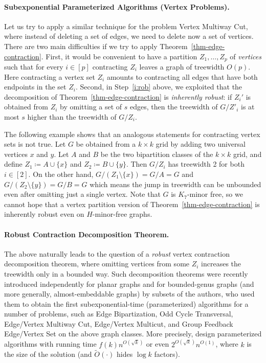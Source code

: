 \documentclass[a4paper,11pt]{article}
\numberwithin{lemma}{section}
\begin{document}
\paragraph{Subexponential Parameterized Algorithms (Vertex Problems).}
Let us try to apply a similar technique for the problem {\sc Vertex Multiway Cut}, where instead of deleting a set of edges, we need to delete now a set of vertices.
There are two main difficulties if we try to apply Theorem~\ref{thm-edge-contraction}.
First, it would be convenient to have a partition $Z_1,\dots,Z_p$ of \emph{vertices} such that for every $i \in [p]$ contracting $Z_i$ leaves a graph of treewidth $O(p)$.
Here contracting a vertex set $Z_i$ amounts to contracting all edges that have both endpoints in  the set $Z_i$.
Second, in Step~\ref{i:rob} above, we exploited that the decomposition of Theorem~\ref{thm-edge-contraction} is \emph{inherently robust}: if $Z_i'$ is obtained from $Z_i$ by omitting a set of $s$ edges, then the treewidth of $G/Z'_i$ is at most $s$ higher than the treewidth of $G/Z_i$.

The following example shows that an analogous statements for contracting vertex sets is not true.
Let $G$ be obtained from a $k\times k$ grid by adding two universal vertices $x$ and $y$.
Let $A$ and $B$ be the two bipartition classes of the $k\times k$ grid, and define $Z_1 \coloneqq A \cup \{x\}$ and $Z_2 \coloneqq B \cup \{y\}$.
Then $G/Z_i$ has treewidth 2 for both $i \in [2]$.
On the other hand, $G/(Z_1\setminus \{x\}) = G/A = G$ and $G/(Z_2\setminus \{y\}) = G/B = G$ which means the jump in treewidth can be unbounded even after omitting just a single vertex.
Note that $G$ is $K_7$-minor free, so we cannot hope that a vertex partition version of Theorem~\ref{thm-edge-contraction} is inherently robust even on $H$-minor-free graphs.

\paragraph{Robust Contraction Decomposition Theorem.}
The above naturally leads to the question of a \emph{robust} vertex contraction decomposition theorem, where omitting vertices from some $Z_i$ increases the treewidth only in a bounded way.
Such decomposition theorems were recently introduced independently for planar graphs \cite{MarxMNT22} and for bounded-genus graphs (and more generally, almost-embeddable graphs) \cite{BandyapadhyayLLSJ22} by subsets of the authors,
who used them to obtain the first subexponential-time (parameterized) algorithms for a number of problems, such as {\sc Edge Bipartization}, {\sc Odd Cycle Transversal}, {\sc Edge/Vertex Multiway Cut}, {\sc Edge/Vertex Multicut}, and {\sc Group Feedback Edge/Vertex Set} on the above graph classes.
More precisely, \cite{BandyapadhyayLLSJ22,MarxMNT22} design parameterized algorithms with running time $f(k)n^{O(\sqrt{k})}$ or even $2^{O(\sqrt{k})}n^{O(1)}$, where $k$ is the size of the solution (and $\widetilde{O}(\cdot)$ hides $\log k$ factors).
\end{document}
